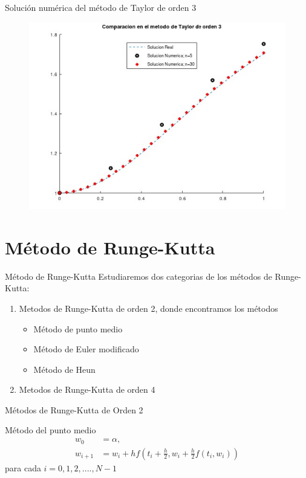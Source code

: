 \begin{frame}{Solución numérica del método de Taylor de orden 3}
\begin{figure}[H]
\centering
\includegraphics[scale=0.8]{TerceraUnidad/Imagen15}
\end{figure}
\end{frame}	
\section{Método de Runge-Kutta}
\begin{frame}{Método de Runge-Kutta}
Estudiaremos dos categorias de los métodos de Runge-Kutta:
\begin{enumerate}
\item Metodos de Runge-Kutta de orden 2, donde encontramos los métodos 
\begin{itemize}
\item Método de punto medio\\

\item Método de Euler modificado\\

\item Método de Heun
\end{itemize}
\item Metodos de Runge-Kutta de orden 4
\end{enumerate}
\end{frame}

\begin{frame}{Métodos de Runge-Kutta de Orden 2}
\begin{block}{Método del punto medio}
\begin{align*}
w_0 &=\alpha,\\
w_{i+1}&=w_{i}+hf(t_i+\frac{h}{2}, w_i+\frac{h}{2}f(t_i, w_i))
\end{align*}
\hspace{3cm}para cada $i=0, 1, 2,...., N-1$
\end{block}
\end{frame}


